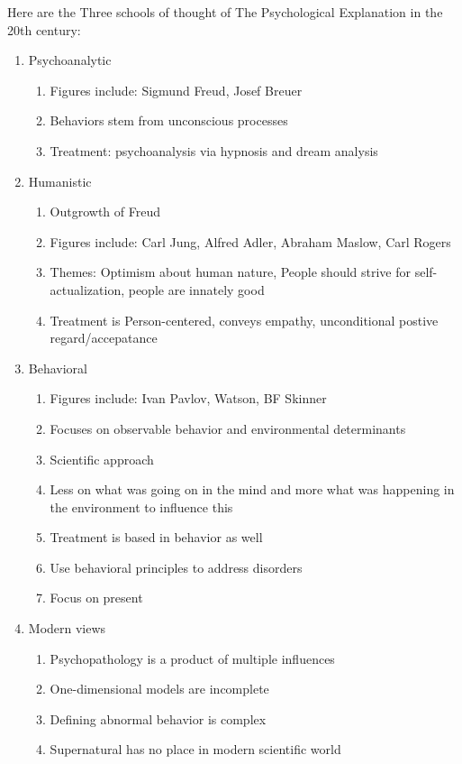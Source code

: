 \documentclass[12pt]{article}
\begin{document}
Here are the Three schools of thought of The Psychological Explanation
in the 20th century:
\begin{enumerate}
\item Psychoanalytic
  \begin{enumerate}
  \item Figures include: Sigmund Freud, Josef Breuer
  \item Behaviors stem from unconscious processes
  \item Treatment: psychoanalysis via hypnosis and dream analysis
  \end{enumerate}
\item Humanistic
  \begin{enumerate}
  \item Outgrowth of Freud
  \item Figures include: Carl Jung, Alfred Adler, Abraham Maslow, Carl Rogers
  \item Themes: Optimism about human nature, People should strive for
    self-actualization, people are innately good
  \item Treatment is Person-centered, conveys empathy, unconditional
    postive regard/accepatance
  \end{enumerate}
\item Behavioral
  \begin{enumerate}
  \item Figures include: Ivan Pavlov, Watson, BF Skinner
  \item Focuses on observable behavior and environmental determinants
  \item Scientific approach
  \item Less on what was going on in the mind and more what was
    happening in the environment to influence this
  \item Treatment is based in behavior as well
  \item Use behavioral principles to address disorders
  \item Focus on present
  \end{enumerate}
\item Modern views
  \begin{enumerate}
  \item Psychopathology is a product of multiple influences
  \item One-dimensional models are incomplete
  \item Defining abnormal behavior is complex
  \item Supernatural has no place in modern scientific world
  \end{enumerate}
\end{enumerate}
\end{document}
